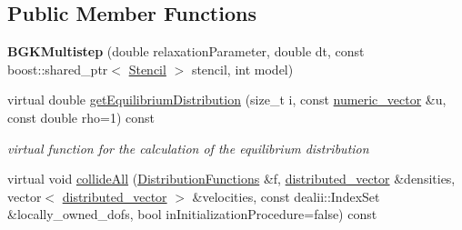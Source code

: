 \subsection*{Public Member Functions}
\begin{DoxyCompactItemize}
\item 
\hypertarget{classnatrium_1_1BGKMultistep_ab85df8b619d85553a18fbe8bbb91c2e2}{
{\bfseries BGKMultistep} (double relaxationParameter, double dt, const boost::shared\_\-ptr$<$ \hyperlink{classnatrium_1_1Stencil}{Stencil} $>$ stencil, int model)}
\label{classnatrium_1_1BGKMultistep_ab85df8b619d85553a18fbe8bbb91c2e2}

\item 
virtual double \hyperlink{classnatrium_1_1BGKMultistep_a034cd475974bcce0db64e52245efd91d}{getEquilibriumDistribution} (size\_\-t i, const \hyperlink{namespacenatrium_a67c39077adc6634f8fa3762b8eef24c4}{numeric\_\-vector} \&u, const double rho=1) const 
\begin{DoxyCompactList}\small\item\em virtual function for the calculation of the equilibrium distribution \item\end{DoxyCompactList}\item 
\hypertarget{classnatrium_1_1BGKMultistep_a503d69a669d91979a885d1b02c2edb0a}{
virtual void \hyperlink{classnatrium_1_1BGKMultistep_a503d69a669d91979a885d1b02c2edb0a}{collideAll} (\hyperlink{classnatrium_1_1DistributionFunctions}{DistributionFunctions} \&f, \hyperlink{namespacenatrium_a903d2b92917f582f2ff05f52160ab811}{distributed\_\-vector} \&densities, vector$<$ \hyperlink{namespacenatrium_a903d2b92917f582f2ff05f52160ab811}{distributed\_\-vector} $>$ \&velocities, const dealii::IndexSet \&locally\_\-owned\_\-dofs, bool inInitializationProcedure=false) const }
\label{classnatrium_1_1BGKMultistep_a503d69a669d91979a885d1b02c2edb0a}


\end{DoxyCompactItemize}

